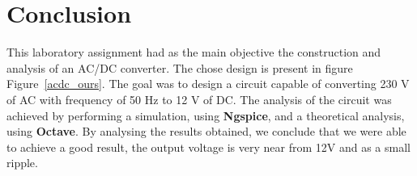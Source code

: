 \section{Conclusion}
\label{sec:conclusion}

This laboratory assignment had as the main objective the construction and analysis of an AC/DC converter. The chose design is present in figure Figure~\ref{acdc_ours}. The goal was to design a circuit capable of converting 230 V of AC with frequency of 50 Hz to 12 V of DC. The analysis of the circuit was achieved by performing a simulation, using {\bf Ngspice}, and a theoretical analysis, using {\bf Octave}. By analysing the results obtained, we conclude that we were able to achieve a good result, the output voltage is very near from 12V and as a small ripple. 


